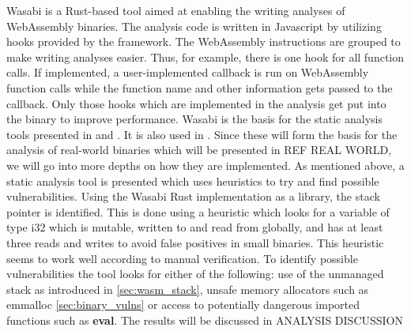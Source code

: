 \documentclass[sigconf]{acmart}
\begin{document}
Wasabi \cite{lehmann_wasabi_2018} is a Rust-based tool aimed at enabling the writing analyses of WebAssembly binaries. The analysis code is written in Javascript by utilizing hooks provided by the framework. The WebAssembly instructions are grouped to make writing analyses easier. Thus, for example, there is one hook for all function calls. If implemented, a user-implemented callback is run on WebAssembly function calls while the function name and other information gets passed to the callback. Only those hooks which are implemented in the analysis get put into the binary to improve performance. Wasabi is the basis for the static analysis tools presented in \cite{lehmann_everything_2020} and \cite{hilbig_empirical_2021}. It is also used in \cite{sun_poster_2021}. Since these will form the basis for the analysis of real-world binaries which will be presented in REF REAL WORLD, we will go into more depths on how they are implemented. As mentioned above, a static analysis tool is presented which uses heuristics to try and find possible vulnerabilities. Using the Wasabi Rust implementation as a library, the stack pointer is identified. This is done using a heuristic which looks for a variable of type i32 which is mutable, written to and read from globally, and has at least three reads and writes to avoid false positives in small binaries. This heuristic seems to work well according to manual verification. To identify possible vulnerabilities the tool looks for either of the following: use of the unmanaged stack as introduced in \ref{sec:wasm_stack}, unsafe memory allocators such as emmalloc \ref{sec:binary_vulns} or access to potentially dangerous imported functions such as \textbf{eval}. The results will be discussed in ANALYSIS DISCUSSION
\end{document}

